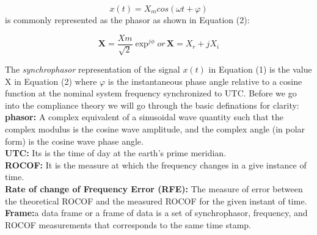 \begin{equation}
x(t) = X_m cos(\omega t + \varphi)
\end{equation}
is commonly represented as the phasor as shown in Equation (2):

\begin{equation}
\textbf{X} = \frac{Xm}{\sqrt{2}}\exp^{j\phi}
or\hspace{2pt} \textbf{X} = X_r+jX_i
\end{equation}

The \textit{synchrophasor} representation of the signal $x(t)$ in Equation (1) is the value X in Equation (2) where $\varphi$ is the instantaneous phase angle relative to a cosine function at the nominal system frequency synchronized to UTC. Before we go into the compliance theory we will go through the basic definations for clarity:\\
\textbf{phasor:} A complex equivalent of a sinusoidal wave quantity such that the complex modulus is the cosine wave amplitude, and the complex angle (in polar form) is the cosine wave phase angle.\\
\textbf{UTC:} Its is the time of day at the earth's prime meridian.\\
\textbf{ROCOF:} It is the measure at which the frequency changes in a give instance of time.\\
\textbf{Rate of change of Frequency Error (RFE):} The measure of error between the theoretical ROCOF and the measured ROCOF for the given instant of time.\\
\textbf{Frame:}a data frame or a frame of data is a set of synchrophasor, frequency, and ROCOF measurements that corresponds to the same time stamp.\\
